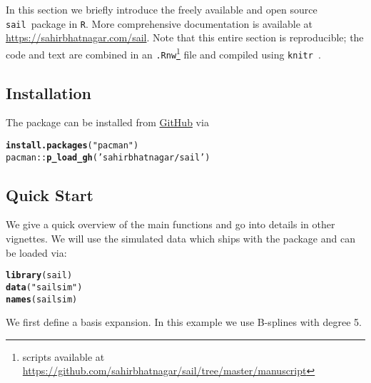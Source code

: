 \documentclass[12pt,letter]{article}\usepackage[]{graphicx}\usepackage[]{color}
\makeatletter
\newcommand{\hlstr}[1]{\textcolor[rgb]{0.192,0.494,0.8}{#1}}%
\newcommand{\hlopt}[1]{\textcolor[rgb]{0,0,0}{#1}}%
\newcommand{\hlstd}[1]{\textcolor[rgb]{0.345,0.345,0.345}{#1}}%
\newcommand{\hlkwd}[1]{\textcolor[rgb]{0.737,0.353,0.396}{\textbf{#1}}}%
\newenvironment{kframe}{%
 \def\at@end@of@kframe{}%
 \ifinner\ifhmode%
  \def\at@end@of@kframe{\end{minipage}}%
  \begin{minipage}{\columnwidth}%
 \fi\fi%
 \def\FrameCommand##1{\hskip\@totalleftmargin \hskip-\fboxsep
 \colorbox{shadecolor}{##1}\hskip-\fboxsep
     \hskip-\linewidth \hskip-\@totalleftmargin \hskip\columnwidth}%
 \MakeFramed {\advance\hsize-\width
   \@totalleftmargin\z@ \linewidth\hsize
   \@setminipage}}%
 {\par\unskip\endMakeFramed%
 \at@end@of@kframe}
\newenvironment{knitrout}{}{} %
\newcommand{\sail}{\texttt{sail}}
\makeatother
\begin{document}
In this section we briefly introduce the freely available and open source \sail ~package in \texttt{R}. More comprehensive documentation is available at \url{https://sahirbhatnagar.com/sail}. Note that this entire section is reproducible; the code and text are combined in an \texttt{.Rnw}\footnote[1]{scripts available at \url{https://github.com/sahirbhatnagar/sail/tree/master/manuscript}} file and compiled using \texttt{knitr}~\citep{xie2015dynamic}. 

\subsection{Installation}

The package can be installed from \href{https://github.com/sahirbhatnagar/sail}{GitHub} via


\begin{knitrout}\scriptsize
{}\color{fgcolor}\begin{kframe}
\begin{alltt}
\hlkwd{install.packages}\hlstd{(}\hlstr{"pacman"}\hlstd{)}
\hlstd{pacman}\hlopt{::}\hlkwd{p_load_gh}\hlstd{(}\hlstr{'sahirbhatnagar/sail'}\hlstd{)}
\end{alltt}
\end{kframe}
\end{knitrout}



\subsection{Quick Start}

We give a quick overview of the main functions and go into details in other vignettes. We will use the simulated data which ships with the package and can be loaded via:

\begin{knitrout}\scriptsize
{}\color{fgcolor}\begin{kframe}
\begin{alltt}
\hlkwd{library}\hlstd{(sail)}
\hlkwd{data}\hlstd{(}\hlstr{"sailsim"}\hlstd{)}
\hlkwd{names}\hlstd{(sailsim)}
\end{alltt}
\end{kframe}
\end{knitrout}

We first define a basis expansion. In this example we use B-splines with degree 5.
\end{document}
